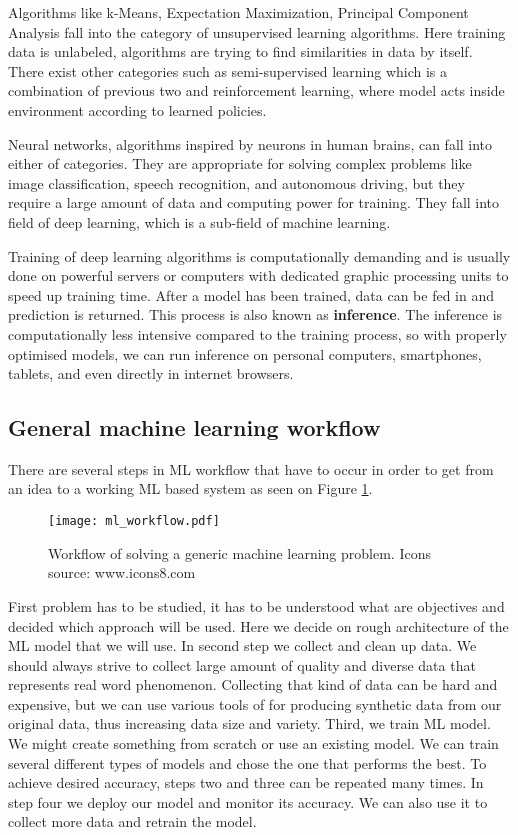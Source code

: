 Algorithms like k-Means, Expectation Maximization, Principal Component Analysis fall into the category of unsupervised learning algorithms.
Here training data is unlabeled, algorithms are trying to find similarities in data by itself\cite{geron}.
There exist other categories such as semi-supervised learning which is a combination of previous two and reinforcement learning, where model acts inside environment according to learned policies\cite{geron}.

Neural networks, algorithms inspired by neurons in human brains\cite{geron}\cite{cs231n}, can fall into either of categories. 
They are appropriate for solving complex problems like image classification, speech recognition, and autonomous driving, but they require a large amount of data and computing power for training.
They fall into field of deep learning, which is a sub-field of machine learning.

Training of deep learning algorithms is computationally demanding and is usually done on powerful servers or computers with dedicated graphic processing units to speed up training time.
After a model has been trained, data can be fed in and prediction is returned. 
This process is also known as \textbf{inference}.
The inference is computationally less intensive compared to the training process, so with properly optimised models, we can run inference on personal computers, smartphones, tablets, and even directly in internet browsers.


\subsection{ General machine learning workflow}

There are several steps in ML workflow that have to occur in order to get from an idea to a working ML based system as seen on Figure \ref{ml_workflow}.

\begin{figure}[ht]
        \centering
        \texttt{[image: ml\_workflow.pdf]} 
        \caption{ Workflow of solving a generic machine learning problem. Icons source: www.icons8.com}
        \label{ml_workflow}
\end{figure}

First problem has to be studied, it has to be understood what are objectives and decided which approach will be used. 
Here we decide on rough architecture of the ML model that we will use.
In second step we collect and clean up data.
We should always strive to collect large amount of quality and diverse data that represents real word phenomenon.
Collecting that kind of data can be hard and expensive, but we can use various tools of for producing synthetic data from our original data, thus increasing data size and variety.
Third, we train ML model.
We might create something from scratch or use an existing model. 
We can train several different types of models and chose the one that performs the best.
To achieve desired accuracy, steps two and three can be repeated many times.
In step four we deploy our model and monitor its accuracy. We can also use it to collect more data and retrain the model.

